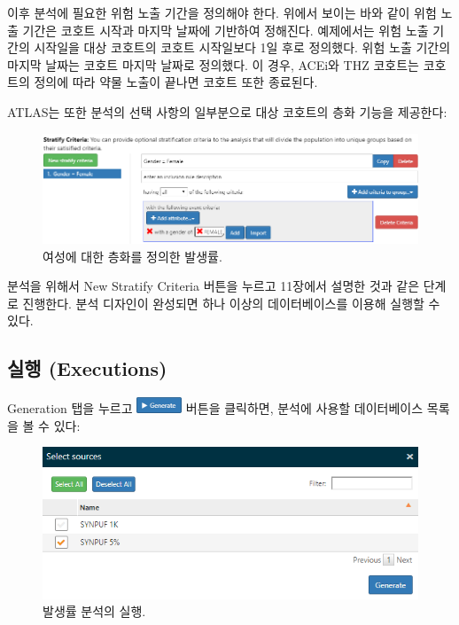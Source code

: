 \documentclass[11pt]{book}
\theoremstyle{definition}
\theoremstyle{definition}
\theoremstyle{definition}
\theoremstyle{remark}
\begin{document}
이후 분석에 필요한 위험 노출 기간을 정의해야 한다. 위에서 보이는 바와
같이 위험 노출 기간은 코호트 시작과 마지막 날짜에 기반하여 정해진다.
예제에서는 위험 노출 기간의 시작일을 대상 코호트의 코호트 시작일보다 1일
후로 정의했다. 위험 노출 기간의 마지막 날짜는 코호트 마지막 날짜로
정의했다. 이 경우, ACEi와 THZ 코호트는 코호트의 정의에 따라 약물 노출이
끝나면 코호트 또한 종료된다.

ATLAS는 또한 분석의 선택 사항의 일부분으로 대상 코호트의 층화 기능을
제공한다:

\begin{figure}

{\centering \includegraphics[width=1\linewidth]{images/Characterization/atlasIncidenceStratifyFemale} 

}

\caption{여성에 대한 층화를 정의한 발생률.}\label{fig:atlasIncidenceStratifyFemale}
\end{figure}

분석을 위해서 New Stratify Criteria 버튼을 누르고 11장에서 설명한 것과
같은 단계로 진행한다. 분석 디자인이 완성되면 하나 이상의 데이터베이스를
이용해 실행할 수 있다.

\subsection{실행 (Executions)}\label{-executions-2}

Generation 탭을 누르고
\includegraphics{images/Characterization/atlasIncidenceGenerate.png}
버튼을 클릭하면, 분석에 사용할 데이터베이스 목록을 볼 수 있다:

\begin{figure}

{\centering \includegraphics[width=1\linewidth]{images/Characterization/atlasIncidenceSourceSelection} 

}

\caption{발생률 분석의 실행.}\label{fig:atlasIncidenceSourceSelection}
\end{figure}
\end{document}
